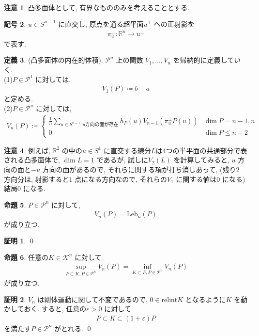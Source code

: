 \documentclass[10pt, fleqn, label-section=none]{bxjsarticle}
\theoremstyle{definition}
\newtheorem{dfn}{定義}[section]
\newtheorem{prop}[dfn]{命題}
\newtheorem{notation}[dfn]{記号}
\newtheorem*{pf*}{証明}
\newtheorem{remark}[dfn]{注意}
\newcommand{\veps}{\varepsilon}
\renewcommand{\;}{\, ; \,}
\begin{document}
\begin{remark}
凸多面体として, 有界なもののみを考えることとする. 
\end{remark}

\begin{notation}$u \in S^{n -1}$ に直交し, 原点を通る超平面$u^\perp$ への正射影を
\begin{align*} \pi^\perp_u : \mathbb R^n \rightarrow u^\perp \end{align*}
で表す. 
\end{notation}

\begin{dfn}(凸多面体の内在的体積). $\mathcal P^n$ 上の関数 $V_1, \ldots, V_n$ を帰納的に定義していく. \\
(1)$P \in \mathcal P^1$ に対しては, 
\begin{align*} V_1 (P) \coloneqq b - a \end{align*} 
と定める. \\
(2)$P \in \mathcal P^n$ に対しては, 
\begin{align*} V_n (P) \coloneqq \begin{cases} \frac{1}{n} \sum_{u \in S^{n-1}; u\textrm{方向の面が存在}} h_P(u) V_{n-1}(\pi^\perp_u P(u)) & \dim P = n-1, n \\ 0 &   \dim P \leq n-2 \end{cases} \end{align*}

\end{dfn}

\begin{remark}
例えば, $\mathbb R^2$ の中の$u \in S^1$ に直交する線分$L$は$4$つの半平面の共通部分で表される凸多面体で, $\dim L = 1$ であるが, 試しに$V_2 (L)$ を計算してみると, $u$ 方向の面と$-u$ 方向の面があるので, それらに関する項が打ち消しあって, (残り$2$ 方向分は, 射影すると$1$ 点になる方向なので, それらの$V_1$ に関する値は$0$ になる) 結局$0$ になる. 
\end{remark} 



\begin{prop}$P \in \mathcal P ^n$ に対して, 
\begin{align*} V_n (P) = \textrm{Leb}_n (P) \end{align*}
が成り立つ. 
\end{prop}
\begin{pf*}

\qed
\end{pf*}


\begin{prop}任意の$K \in \mathcal K^n$ に対して
\begin{align*} \sup_{P \subset K, P \in \mathcal P^n} V_n (P) = \inf_{K \subset P, P \in \mathcal P^n} V_n (P)  \end{align*}
が成り立つ. 
\end{prop}
\begin{pf*}$V_n$ は剛体運動に関して不変であるので, $0 \in \textrm{relint} K$ となるように$K$ を動かしておく. すると, 任意の$\veps >0$ に対して 
\begin{align*} P \subset K \subset (1 + \veps) P\end{align*}
を満たす$P \in \mathcal P^n$ がとれる.  
\qed
\end{pf*}
\end{document}
